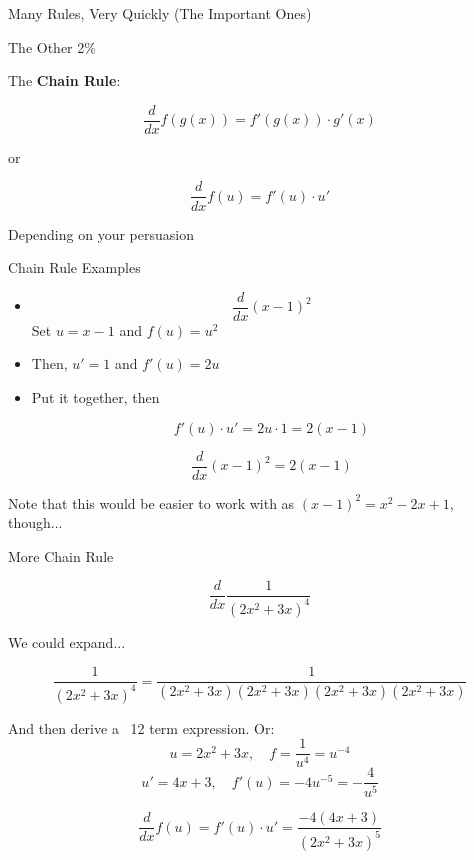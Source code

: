 \documentclass[10pt]{beamer}
\begin{document}
\begin{frame}
\thispagestyle{empty}
\vspace{1cm}
\begin{center}
\begin{Huge}
    Many Rules, Very Quickly (The Important Ones)
\end{Huge}
\end{center}
\end{frame}

\begin{frame}{The Other 2\%}

The \textbf{Chain Rule}:

\[\frac{d}{dx} f(g(x)) = f'(g(x)) \cdot g'(x)\]

or

\[\frac{d}{dx} f(u) = f'(u) \cdot u'\]

Depending on your persuasion 

\end{frame}

\begin{frame}{Chain Rule Examples}
    \begin{itemize}
        \item \[\frac{d}{dx} (x-1)^2\]
        Set $u = x-1$ and $f(u) = u^2$ \pause
        \item Then, $u' = 1$ and $f'(u) = 2u$ \pause
        \item Put it together, then

        \[f'(u) \cdot u' = 2u \cdot 1 = 2(x-1)\]

        \[\frac{d}{dx} (x-1)^2 = 2(x-1)\]
    \end{itemize}
    Note that this would be easier to work with as $(x-1)^2 = x^2 - 2x + 1$, though...
\end{frame}

\begin{frame}{More Chain Rule}

\[\frac{d}{dx} \frac{1}{(2x^2 + 3x)^4}\]

We could expand...

\[\frac{1}{(2x^2 + 3x)^4} = \frac{1}{(2x^2 + 3x)(2x^2 + 3x)(2x^2 + 3x)(2x^2 + 3x)}\]

And then derive a ~12 term expression. Or:
\pause
\[u = 2x^2 + 3x, \quad f = \frac{1}{u^4} = u^{-4}\]
\[u' = 4x + 3, \quad f'(u) = -4u^{-5} = -\frac{4}{u^5} \]

\[\frac{d}{dx} f(u) = f'(u) \cdot u' = \frac{-4(4x +3)}{(2x^2 + 3x)^5} \]

\end{frame}
\end{document}
